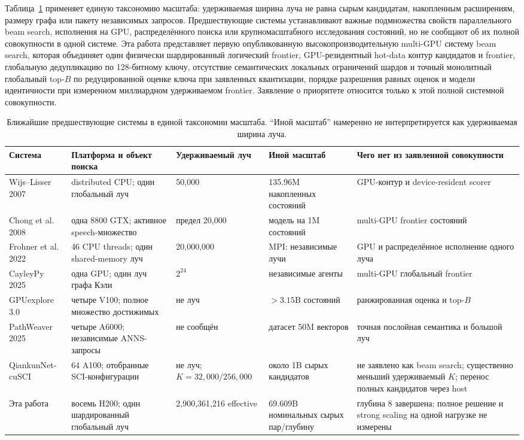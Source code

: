 \documentclass[10pt,twocolumn]{article}
\begin{document}
Таблица~\ref{tab:prior_art} применяет единую таксономию масштаба: удерживаемая
ширина луча не равна сырым кандидатам, накопленным расширениям, размеру графа
или пакету независимых запросов. Предшествующие системы устанавливают важные
подмножества свойств параллельного beam search, исполнения на GPU,
распределённого поиска или крупномасштабного исследования состояний, но не
сообщают об их полной совокупности в одной системе. Эта работа представляет
первую опубликованную высокопроизводительную multi-GPU систему beam search,
которая объединяет один физически шардированный логический frontier,
GPU-резидентный hot-data контур кандидатов и frontier, глобальную дедупликацию
по 128-битному ключу, отсутствие семантических локальных ограничений шардов и
точный монолитный глобальный top-$B$ по редуцированной оценке ключа при
заявленных квантизации, порядке разрешения равных оценок и модели идентичности
при измеренном миллиардном удерживаемом frontier. Заявление о приоритете
относится только к этой полной системной совокупности.

\begin{table}[t]
\centering
\footnotesize
\caption{Ближайшие предшествующие системы в единой таксономии масштаба.
``Иной масштаб'' намеренно не интерпретируется как удерживаемая ширина луча.}
\label{tab:prior_art}
\setlength{\tabcolsep}{2.5pt}
\begin{tabular}{@{}p{2.7cm}p{3.7cm}p{3.0cm}p{3.0cm}p{4.2cm}@{}}
\toprule
Система & Платформа и объект поиска & Удерживаемый луч & Иной масштаб & Чего нет из заявленной совокупности \\
\midrule
Wijs--Lisser 2007 & distributed CPU; один глобальный луч & 50,000 & 135.96M накопленных состояний & GPU-контур и device-resident scorer \\
Chong et al. 2008 & одна 8800 GTX; активное speech-множество & предел 20,000 & модель на 1M состояний & multi-GPU frontier состояний \\
Frohner et al. 2022 & 46 CPU threads; один shared-memory луч & 20,000,000 & MPI: независимые лучи & GPU и распределённое исполнение одного луча \\
CayleyPy 2025 & одна GPU; один луч графа Кэли & $2^{24}$ & независимые агенты & multi-GPU глобальный frontier \\
GPUexplore 3.0 & четыре V100; полное множество достижимых & не луч & $>3.15$B состояний & ранжированная оценка и top-$B$ \\
PathWeaver 2025 & четыре A6000; независимые ANNS-запросы & не сообщён & датасет 50M векторов & точная послойная семантика и большой луч \\
QiankunNet-cuSCI & 64 A100; отобранные SCI-конфигурации & не луч; $K=32{,}000/256{,}000$ & около 1B сырых кандидатов & не заявлено как beam search; существенно меньший удерживаемый $K$; перенос полных кандидатов через host \\
Эта работа & восемь H200; один шардированный глобальный луч & 2,900,361,216 effective & 69.609B номинальных сырых пар/глубину & глубина 8 завершена; полное решение и strong scaling на одной нагрузке не измерены \\
\bottomrule
\end{tabular}
\end{table}
\end{document}
